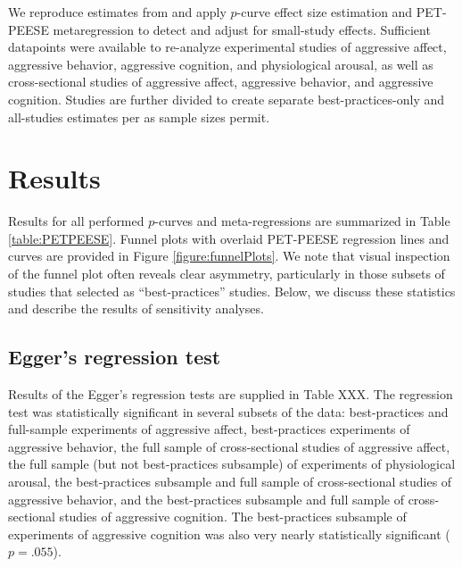 \documentclass[man]{apa6}
\begin{document}
We reproduce estimates from \citet{Anderson:etal:2010} and apply $p$-curve effect size estimation and PET-PEESE metaregression to detect and adjust for small-study effects. Sufficient datapoints were available to re-analyze experimental studies of aggressive affect, aggressive behavior, aggressive cognition, and physiological arousal, as well as cross-sectional studies of aggressive affect, aggressive behavior, and aggressive cognition. Studies are further divided to create separate best-practices-only and all-studies estimates per \citet{Anderson:etal:2010} as sample sizes permit. 


\section{Results}
Results for all performed $p$-curves and meta-regressions are summarized in Table \ref{table:PETPEESE}. 
Funnel plots with overlaid PET-PEESE regression lines and curves are provided in Figure \ref{figure:funnelPlots}. We note that visual inspection of the funnel plot often reveals clear asymmetry, particularly in those subsets of studies that \citet{Anderson:etal:2010} selected as ``best-practices'' studies.
Below, we discuss these statistics and describe the results of sensitivity analyses.

\subsection{Egger's regression test}
Results of the Egger's regression tests are supplied in Table XXX. The regression test was statistically significant in several subsets of the data: best-practices and full-sample experiments of aggressive affect, best-practices experiments of aggressive behavior, the full sample of cross-sectional studies of aggressive affect, the full sample (but not best-practices subsample) of experiments of physiological arousal, the best-practices subsample and full sample of cross-sectional studies of aggressive behavior, and the best-practices subsample and full sample of cross-sectional studies of aggressive cognition. The best-practices subsample of experiments of aggressive cognition was also very nearly statistically significant ($p = .055$).
\end{document}
